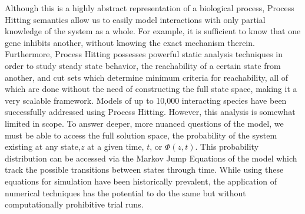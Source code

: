 \documentclass[en]{jdoc}
\begin{document}
Although this is a highly abstract representation of a biological process, Process Hitting semantics allow us to easily model interactions with only partial knowledge of the system as a whole. For example, it is sufficient to know that one gene inhibits another, without knowing the exact mechanism therein. Furthermore, Process Hitting possesses powerful static analysis techniques in order to study steady state behavior, the reachability of a certain state from another, and cut sets which determine minimum criteria for reachability, all of which are done without the need of constructing the full state space, making it a very scalable framework. Models of up to 10,000 interacting species \cite{} have been successfully addressed using Process Hitting. However, this analysis is somewhat limited in scope. To answer deeper, more nuanced questions of the model, we must be able to access the full solution space, the probability of the system existing at any state,$z$ at a given time, $t$, or $\Phi(z,t)$. This probability distribution can be accessed via the Markov Jump Equations of the model which track the possible transitions between states through time. While using these equations for simulation have been historically prevalent, the application of numerical techniques has the potential to do the same but without computationally prohibitive trial runs.
\end{document}
